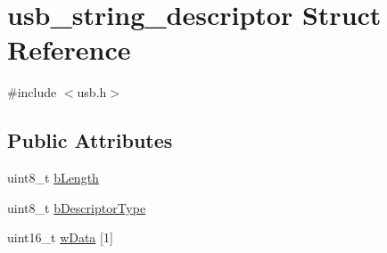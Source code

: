 \hypertarget{structusb__string__descriptor}{\section{usb\-\_\-string\-\_\-descriptor Struct Reference}
\label{structusb__string__descriptor}
}


{\ttfamily \#include $<$usb.\-h$>$}

\subsection*{Public Attributes}
\begin{DoxyCompactItemize}
\item 
uint8\-\_\-t \hyperlink{structusb__string__descriptor_a93d9bb7c2c44f6f0cae1a871a4a18789}{b\-Length}
\item 
uint8\-\_\-t \hyperlink{structusb__string__descriptor_a37d44e07cb6d5b449b03fb70c9677b15}{b\-Descriptor\-Type}
\item 
uint16\-\_\-t \hyperlink{structusb__string__descriptor_a33eb9ec89e16e8097c5baa46f5940859}{w\-Data} \mbox{[}1\mbox{]}
\end{DoxyCompactItemize}


